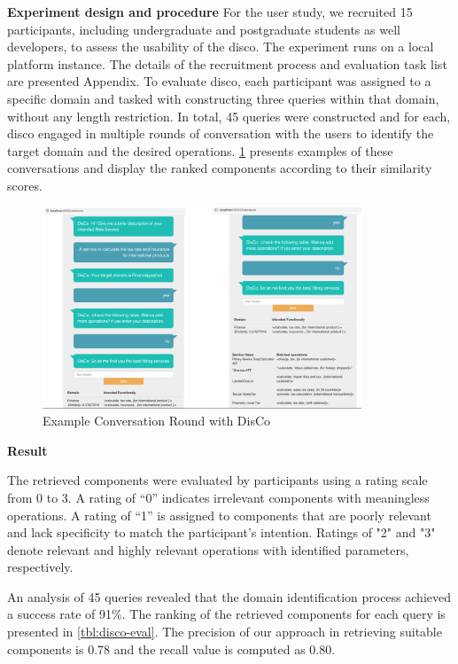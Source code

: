 \textbf{Experiment design and procedure}
For the user study, we recruited 15 participants, including undergraduate and postgraduate students as well developers, to assess the usability of the \gls{disco}. The experiment runs on a local platform instance. The details of the recruitment process and evaluation task list are presented Appendix.
To evaluate \gls{disco}, each participant was assigned to a specific domain and tasked with constructing three queries within that domain, without any length restriction. In total, 45 queries were constructed and for each, \gls{disco} engaged in multiple rounds of conversation with the users to identify the target domain and the desired operations.  \cref{fig:disco-conversation} presents examples of these conversations and display the ranked components according to their similarity scores.

\begin{figure}[hbt]
\hypertarget{fig:disco-conversation}{%
\centering
\includegraphics[width=0.85\textwidth]{../figures/MyFigures/DosCoCon.png}
\captionsetup{justification=centering}
\caption{Example Conversation Round with DisCo}\label{fig:disco-conversation}
}
\end{figure}

\textbf{Result}

The retrieved components were evaluated by participants using a rating
scale from 0 to 3. A rating of ``0'' indicates irrelevant components
with meaningless operations. A rating of ``1'' is assigned to components
that are poorly relevant and lack specificity to match the participant's
intention. Ratings of "2" and "3" denote relevant and highly
relevant operations with identified parameters, respectively.

An analysis of 45 queries revealed that the domain identification
process achieved a success rate of 91\%. The ranking of the retrieved
components for each query is presented in \cref{tbl:disco-eval}. The precision of
our approach in retrieving suitable components is 0.78 and the recall
value is computed as 0.80.

